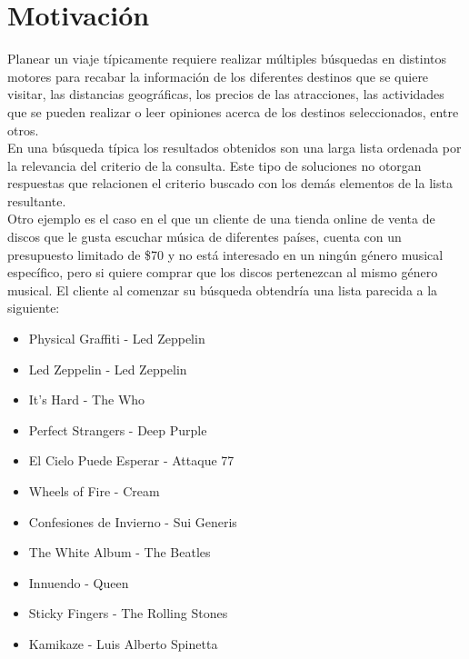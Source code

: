 \section{Motivación}
Planear un viaje típicamente requiere realizar múltiples búsquedas en distintos motores para recabar la información de los diferentes destinos que se quiere visitar, las distancias geográficas, los precios de las atracciones, las actividades que se pueden realizar o leer opiniones acerca de los destinos seleccionados, entre otros.\\
En una búsqueda típica los resultados obtenidos son una larga lista ordenada por la relevancia del criterio de la consulta. Este tipo de soluciones no otorgan respuestas que relacionen el criterio buscado con los demás elementos de la lista resultante.\\
Otro ejemplo es el caso en el que un cliente de una tienda online de venta de discos que le gusta escuchar música de diferentes países, cuenta con un presupuesto limitado de \$70 y no está interesado en un ningún género musical específico, pero si quiere comprar que los discos pertenezcan al mismo género musical. El cliente al comenzar su búsqueda obtendría una lista parecida a la siguiente:
\begin{itemize}
  \item Physical Graffiti - Led Zeppelin
  \item Led Zeppelin - Led Zeppelin
  \item It's Hard - The Who 
  \item Perfect Strangers - Deep Purple
  \item El Cielo Puede Esperar - Attaque 77
  \item Wheels of Fire - Cream
  \item Confesiones de Invierno - Sui Generis
  \item The White Album - The Beatles
  \item Innuendo - Queen
  \item Sticky Fingers - The Rolling Stones
  \item Kamikaze - Luis Alberto Spinetta
\end{itemize}

